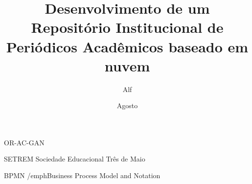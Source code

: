 \documentclass[diss]{template/setrem}
\title{Desenvolvimento de um Repositório Institucional de Periódicos Acadêmicos baseado em nuvem}
\author{Alf}{Lucas Machado}
\date{Agosto}{2022}
\begin{document}
\maketitle
% 











\begin{singlespaced}
  \listoftables
\end{singlespaced}



\begin{listofabbrv}{OR-AC-GAN} %
  \item[SETREM] {Sociedade Educacional Três de Maio}
  \item[BPMN] {/emph{Business Process Model and Notation}}
\end{listofabbrv}

% 
\tableofcontents

\pagestyle{empty}
{
  
}


% 
% 


%


\end{document}
